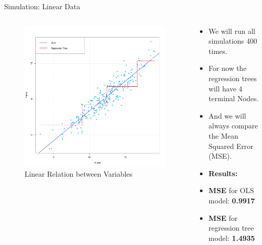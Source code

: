 \documentclass[10pt]{beamer}
\begin{document}
\begin{frame}{Simulation: Linear Data}
    \begin{columns}[T]
        \begin{column}{0.5\textwidth}
            \begin{figure}
                \centering
                \includegraphics[width=1\linewidth]{OLS vs Tree.png}
                \caption{Linear Relation between Variables}
                \label{fig:sub4}  %
            \end{figure}
        \end{column}
        \begin{column}{0.5\textwidth}

            \begin{itemize}
                \vspace{0.7cm}

                \item We will run all simulations 400 times.
                \item For now the regression trees will have 4 terminal Nodes.
                \item And we will always compare the Mean Squared Error (MSE).
                      \vspace{1cm}
                \item \textbf{Results:}
                \item \textbf{MSE} for OLS model: \textbf{0.9917}
                \item \textbf{MSE} for regression tree model: \textbf{1.4935}
            \end{itemize}
        \end{column}
    \end{columns}
\end{frame}
\end{document}
